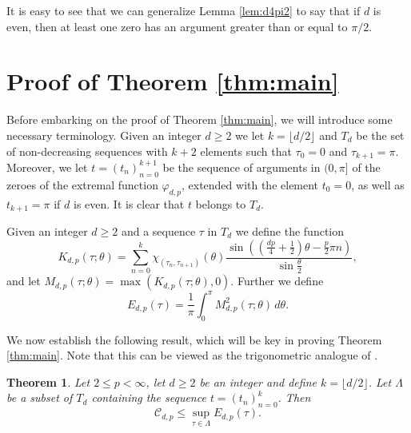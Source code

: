 \documentclass{amsart}
\theoremstyle{plain}
\newtheorem{theorem}{Theorem}
\theoremstyle{remark}
\begin{document}
	It is easy to see that we can generalize Lemma \ref{lem:d4pi2} to say that if $d$ is even, then at least one zero has an argument greater than or equal to $\pi/2$. 
	\section{Proof of Theorem \ref{thm:main}}\label{sec:mainproof}
	Before embarking on the proof of Theorem \ref{thm:main}, we will introduce some necessary terminology. Given an integer $d \geq 2$ we let $k=\lfloor d/2 \rfloor$ and $T_d$ be the set of non-decreasing sequences with $k+2$ elements such that $\tau_0=0$ and $\tau_{k+1}=\pi$. Moreover, we let $t=(t_n)_{n=0}^{k+1}$ be the sequence of arguments in $(0, \pi]$ of the zeroes of the extremal function $\varphi_{d, p}$, extended with the element $t_0=0$, as well as $t_{k+1}= \pi$ if $d$ is even. It is clear that $t$ belongs to $T_d$.
	
	Given an integer $d \geq 2$ and a sequence $\tau$ in $T_d$ we define the function
	\[K_{d,p}(\tau; \theta)=\sum_{n=0}^{k} \chi_{(\tau_n,\tau_{n+1})}(\theta) \frac{\sin ((\frac{dp}{4}+\frac{1}{2})\theta-\frac{p}{2} \pi n)}{\sin\frac{\theta}{2}},\]
	and let $M_{d,p}(\tau; \theta)=\max(K_{d,p}(\tau; \theta),0)$. Further we define 
	\[E_{d,p}(\tau)=\frac{1}{\pi} \int_{0}^{\pi} M_{d,p}^2(\tau; \theta) \, d \theta.\]
	
	We now establish the following result, which will be key in proving Theorem \ref{thm:main}. Note that this can be viewed as the trigonometric analogue of \cite[Corollary 6.1]{Brevig}. 
	\begin{theorem}\label{thm:cor61analogi}
		Let $2 \leq p < \infty$, let $d \geq 2$ be an integer and define $k=\lfloor d/2 \rfloor$. Let $\Lambda$ be a subset of $T_d$ containing the sequence $t=(t_n)_{n=0}^k$. 
		Then
		\[\mathscr{C}_{d,p} \leq \sup_{\tau \in \Lambda} E_{d,p}(\tau).\]
	\end{theorem}
	
\end{document}
